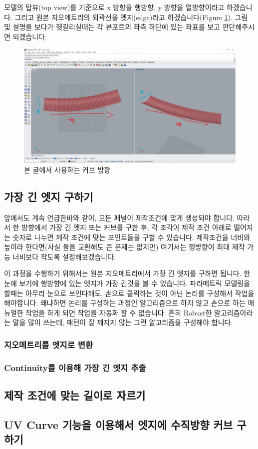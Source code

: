 \documentclass[11pt]{article}
\begin{document}
모델의 탑뷰(top view)를 기준으로 x 방향을 행방향, y 방향을 열방향이라고 하겠습니다. 그리고 원본 지오메트리의 외곽선을 엣지(edge)라고 하겠습니다(Figure \ref{fig:mbs_07_lang}). 그림 및 설명을 보다가 헷갈리실때는 각 뷰포트의 좌측 하단에 있는 좌표를 보고 판단해주시면 되겠습니다.
\begin{figure}[H]
    \includegraphics[width=\textwidth]{./img/mbs_07_lang.png}
    \caption{본 글에서 사용하는 커브 방향}
    \label{fig:mbs_07_lang}
\end{figure}
\subsection{가장 긴 엣지 구하기}
앞에서도 계속 언급한바와 같이, 모든 패널이 제작조건에 맞게 생성되야 합니다. 따라서 한 방향에서 가장 긴 엣지 또는 커브를 구한 후, 각 조각이 제작 조건 아래로 떨어지는 숫자로 나누면 제작 조건에 맞는 포인트들을 구할 수 있습니다.
 제작조건을 너비와 높이라 한다면(사실 둘을 교환해도 큰 문제는 없지만) 여기서는 행방향이 최대 제작 가능 너비보다 작도록 설정해보겠습니다. 

이 과정을 수행하기 위해서는 원본 지오메트리에서 가장 긴 엣지를 구하면 됩니다. 한눈에 보기에 행방향에 있는 엣지가 가장 긴것을 볼 수 있습니다. 파라메트릭 모델링을 할때는 아무리 눈으로 보인다해도, 손으로 클릭하는 것이 아닌 논리를 구성해서 작업을 해야합니다.
 왜냐하면 논리를 구성하는 과정인 알고리즘으로 하지 않고 손으로 하는 매뉴얼한 작업을 하게 되면 작업을 자동화 할 수 없습니다. 흔히 Robust한 알고리즘이라는 말을 많이 쓰는데, 패턴이 잘 깨지지 않는 그런 알고리즘을 구성해야 합니다.

\subsubsection{지오메트리를 엣지로 변환}
\subsubsection{Continuity를 이용해 가장 긴 엣지 추출}
\subsection{제작 조건에 맞는 길이로 자르기}
\subsection{UV Curve 기능을 이용해서 엣지에 수직방향 커브 구하기}
\end{document}
